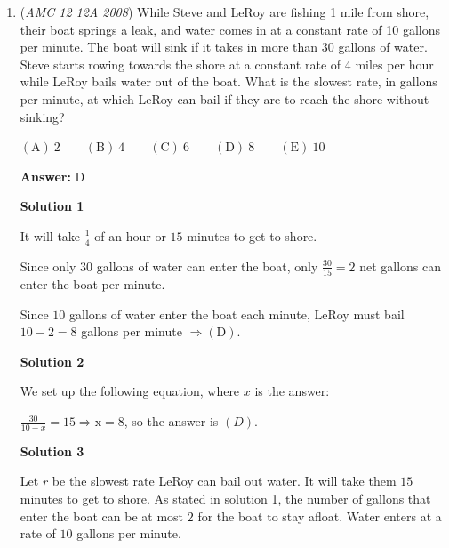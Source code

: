 \begin{enumerate}
 



\textbf{Solution 2}

The $\$ 90$ at store $A$ is $\$ 15$ greater than the additional $25\%-15\% = 10\%$ off at store $B$.

 Thus the $10\%$ off is equal to $\$ 90$ $-$ $\$ 15$ $=$ $\$ 75$, and therefore the sticker price is $\$ 750$.

 


	\item (\textit{AMC 12 12A 2008}) While Steve and LeRoy are fishing 1 mile from shore, their boat springs a leak, and water comes in at a constant rate of 10 gallons per minute. The boat will sink if it takes in more than 30 gallons of water. Steve starts rowing towards the shore at a constant rate of 4 miles per hour while LeRoy bails water out of the boat. What is the slowest rate, in gallons per minute, at which LeRoy can bail if they are to reach the shore without sinking?


 $\mathrm{(A)}\ 2\qquad\mathrm{(B)}\ 4\qquad\mathrm{(C)}\ 6\qquad\mathrm{(D)}\ 8\qquad\mathrm{(E)}\ 10$

 \textbf{Answer: }D



\textbf{Solution 1}

It will take $\frac{1}{4}$ of an hour or $15$ minutes to get to shore.

 Since only $30$ gallons of water can enter the boat, only $\frac{30}{15}=2$ net gallons can enter the boat per minute.

 Since $10$ gallons of water enter the boat each minute, LeRoy must bail $10-2=8$ gallons per minute $\Rightarrow\mathrm{(D)}$.

 


 



\textbf{Solution 2}

We set up the following equation, where $x$ is the answer:

 $\frac{30}{10-x} = 15 \Rightarrow\mathrm{x=8}$, so the answer is $(D)$.

 



\textbf{Solution 3}

Let $r$ be the slowest rate LeRoy can bail out water. It will take them $15$ minutes to get to shore. As stated in solution 1, the number of gallons that enter the boat can be at most $2$ for the boat to stay afloat. Water enters at a rate of $10$ gallons per minute. 


\end{enumerate}
